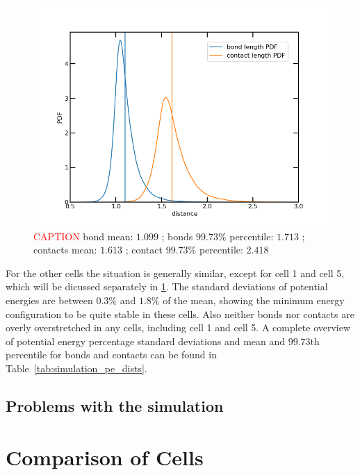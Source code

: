 \documentclass[a4paper,11pt,oneside,final,english,toc=bib,draft]{scrbook}
\begin{document}
\begin{figure}[ht]
\centering
  \includegraphics[width=12cm]{distance_pdf_cell2.png}
  \caption{\textcolor{red}{CAPTION} bond mean: \(\num{1.099}\) ; bonds \(99.73\%\) percentile: \(1.713\) ; contacts mean: \(\num{1.613}\) ; contact \(99.73\%\) percentile: \(2.418\)}
  \label{img:distance_pdf_cell2}
\end{figure}

For the other cells the situation is generally similar, except for cell 1 and cell 5, which will be dicussed separately in \ref{sec:problems_with_the_simulation}. The standard deviations of potential energies are between \(0.3\%\) and \(1.8\%\) of the mean, showing the minimum energy configuration to be quite stable in these cells. Also neither bonds nor contacts are overly overstretched in any cells, including cell 1 and cell 5. A complete overview of potential energy percentage standard deviations and mean and \(99.73\)th percentile for bonds and contacts can be found in Table~\ref{tab:simulation_pe_dists}.


\section{Problems with the simulation} %
\label{sec:problems_with_the_simulation}




\chapter{Comparison of Cells} %
\label{cha:comparison_of_cells}
\end{document}

